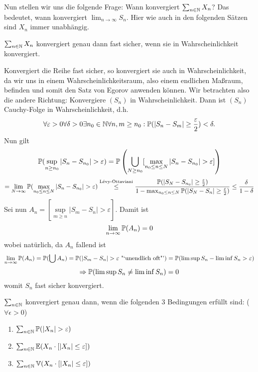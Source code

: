 			\begin{bem}
				Nun stellen wir uns die folgende Frage:
				Wann konvergiert $\sum_{n\in\N}X_n$? Das bedeutet, wann konvergiert $\lim_{n\to\infty}S_n$. \newline
				Hier wie auch in den folgenden Sätzen sind $X_n$ immer unabhängig. 
			\end{bem}
			
			\begin{satz}
				$\sum_{n\in\N}X_n$ konvergiert genau dann fast sicher, wenn sie in Wahrscheinlichkeit konvergiert. 
			\end{satz}
			
			\begin{bew}
				Konvergiert die Reihe fast sicher, so konvergiert sie auch in Wahrscheinlichkeit, da wir uns in einem Wahrscheinlichkeitsraum, also einem endlichen Maßraum, befinden und somit den Satz von Egorov anwenden können. Wir betrachten also die andere Richtung:\newline
				Konvergiere $(S_n)$ in Wahrscheinlichkeit. Dann ist $(S_n)$ Cauchy-Folge in Wahrscheinlichkeit, d.h. 
				\[ \forall\varepsilon>0\forall\delta>0\exists n_0\in\N\forall n,m\ge n_0: \P(|S_n-S_m|\ge \frac{\varepsilon}{2})<\delta. \]
				Nun gilt
				\[ \P(\sup_{n\ge n_0}|S_n-S_{n_0}|>\varepsilon)=\P\left(\bigcup_{N\ge n_0}[\max_{n_0\le n\le N} |S_n-S_{n_0}|>\varepsilon]\right) \]
				\[ =\lim_{N\to\infty}\P(\max_{n_0\le n\le N}|S_n-S_{n_0}|>\varepsilon)\stackrel{\text{Lévy-Ottaviani}}{\le}\frac{\P(|S_N-S_{n_0}|\ge\frac{\varepsilon}{2})}{1-\max_{n_0\le n\le N}\P(|S_N-S_n|\ge\frac{\varepsilon}{2})}\le \frac{\delta}{1-\delta} \]
				Sei nun $A_n=[\sup\limits_{m\ge n}|S_m-S_n|>\varepsilon]$. Damit ist
				\[ \lim_{n\to\infty}\P(A_n)=0 \]
				wobei natürlich, da $A_n$ fallend ist 
				\[ \lim_{n\to\infty}\P(A_n)=\P(\bigcup A_n)=\P(|S_m-S_n|>\varepsilon\text{ "`unendlich oft"'})=\P(\limsup S_n-\liminf S_n>\varepsilon) \]
				\[ \Rightarrow \P(\limsup S_n\neq \liminf S_n)=0 \]
				womit $S_n$ fast sicher konvergiert. 
			\end{bew}
			
			\begin{satz}
				$\sum_{n\in\N}$ konvergiert genau dann, wenn die folgenden 3 Bedingungen erfüllt sind: ($\forall \epsilon>0$)
				\begin{enumerate}[(1)]
					\item $\sum_{n\in\N}\P(|X_n|>\varepsilon)$
					\item $\sum_{n\in\N}\E(X_n\cdot[|X_n|\le \varepsilon])$
					\item $\sum_{n\in\N}\V(X_n\cdot[|X_n|\le \varepsilon])$
				\end{enumerate}
			\end{satz}
			

